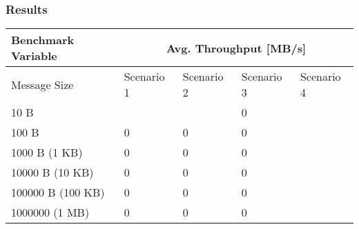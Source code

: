 \subsubsection{Results}
\begin{table}[H]
\centering
\begin{tabular}{|l|l|l|l|l|}
\hline
{\bf Benchmark Variable} & \multicolumn{4}{c|}{{\bf Avg. Throughput {[}MB/s{]}}} \\ \hline
Message Size             & Scenario 1       & Scenario 2       & Scenario 3     & Scenario 4 \\ \hline
10 B                     &                  &                  & 0              &           \\ \hline
100 B                    & 0                & 0                & 0              &            \\ \hline
1000 B (1 KB)            & 0                & 0                & 0              &            \\ \hline
10000 B (10 KB)          & 0                & 0                & 0              &            \\ \hline
100000 B (100 KB)        & 0                & 0                & 0              &             \\ \hline
1000000 (1 MB)           & 0                & 0                & 0              &             \\ \hline
\end{tabular}
\end{table}






